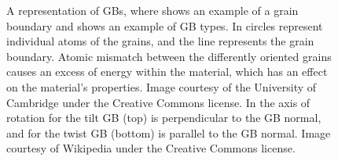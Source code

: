 \documentclass[twoside,senior]{BYUPhys}
\begin{document}
\begin{figure}[ht!]
 \centering
 
 \quad
 \quad
 \caption[Examples and types of grain boundaries.]{\label{gbs} A representation of GBs, where \protect{} shows an example of a grain boundary and \protect{} shows an example of GB types.  In \protect{} circles represent individual atoms of the grains, and the line represents the grain boundary.  Atomic mismatch between the differently oriented grains causes an excess of energy within the material, which has an effect on the material's properties.  Image courtesy of the University of Cambridge under the Creative Commons license. In \protect{} the axis of rotation for the tilt GB (top) is perpendicular to the GB normal, and for the twist GB (bottom) is parallel to the GB normal.  Image courtesy of Wikipedia under the Creative Commons license.}
\end{figure}
\end{document}
